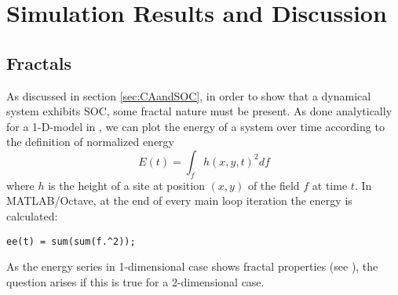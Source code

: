 \chapter{Simulation Results and Discussion}
\thispagestyle{fancy}

\section{Fractals}
As discussed in section \ref{sec:CAandSOC}, in order to show that a dynamical system exhibits SOC, some fractal nature must be present. As done analytically for a 1-D-model in \cite{fractal_avalanching}, we can plot the energy of a system over time according to the definition of normalized energy
\[
E(t) = \int_f h(x,y,t)^2 df
\]
where $h$ is the height of a site at position $(x,y)$ of the field $f$ at time $t$. In MATLAB/Octave, at the end of every main loop iteration the energy is calculated:
\begin{lstlisting}
ee(t) = sum(sum(f.^2));
\end{lstlisting}
As the energy series in 1-dimensional case shows fractal properties (see \cite{fractal_avalanching}), the question arises if this is true for a 2-dimensional case.
